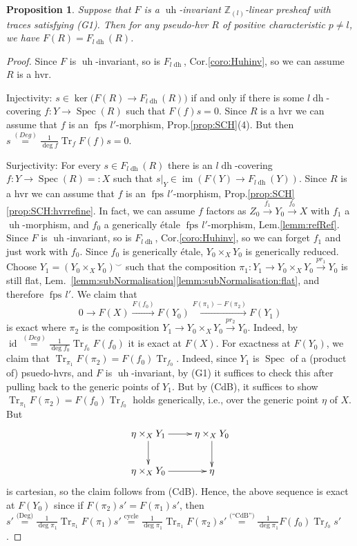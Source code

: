 \documentclass[10pt]{amsart}
\newtheorem{prop}[theo]{Proposition}
\theoremstyle{definition}
\newcommand{\zll}{\mathbb{Z}_{(l)}}
\DeclareMathOperator{\Spec}{Spec}
\DeclareMathOperator{\Tr}{Tr}
\DeclareMathOperator{\id}{id}
\newcommand{\Zar}{\mathsf{Zar}}
\newcommand{\fpsl}{{\operatorname{fps\!}l'}}
\newcommand{\ldh}{{l{\operatorname{dh}}}}
\newcommand{\uh}{\operatorname{uh}}
\begin{document}


\begin{prop} \label{prop:FisFldhonHvr}
Suppose that $F$ is a $\uh$-invariant $\zll$-linear presheaf with traces satisfying (G1). Then for any pseudo-hvr $R$ of positive characteristic $p \neq l$, we have $F(R) = F_\ldh(R)$.
\end{prop}

\begin{proof}
Since $F$ is $\uh$-invariant, so is $F_\ldh$, Cor.\ref{coro:Huhinv}, so we can assume $R$ is a hvr.

Injectivity: $s \in \ker \bigl ( F(R) {\to} F_\ldh(R) \bigr )$ if and only if there is some $\ldh$-covering $f: Y \to \Spec(R)$ such that $F(f)s = 0$. Since $R$ is a hvr we can assume that $f$ is an $\fpsl$-morphism, Prop.\ref{prop:SCH}(4). But then $s \stackrel{(Deg)}{=} \tfrac{1}{\deg f} \Tr_f F(f) s = 0$.

Surjectivity: For every $s \in F_\ldh(R)$ there is an $\ldh$-covering $f: Y \to \Spec(R) =: X$ such that $s|_{Y} \in \operatorname{im} (F(Y) {\to} F_\ldh(Y))$. Since $R$ is a hvr we can assume that $f$ is an $\fpsl$-morphism, Prop.\ref{prop:SCH}\eqref{prop:SCH:hvrrefine}. In fact, we can assume $f$ factors as $Z_0 \stackrel{f_1}{\to} Y_0 \stackrel{f_0}{\to} X$ with $f_1$ a $\uh$-morphism, and $f_0$ a generically étale $\fpsl$-morphism, Lem.\ref{lemm:refRef}. Since $F$ is $\uh$-invariant, so is $F_\ldh$, Cor.\ref{coro:Huhinv}, so we can forget $f_1$ and just work with $f_0$. Since $f_0$ is generically étale, $Y_0 \times_X Y_0$ is generically reduced. Choose $Y_1 = (Y_0 \times_X Y_0)^\smallsmile$ such that the composition $\pi_1: Y_1 \to Y_0 \times_X Y_0 \stackrel{pr_1}{\to} Y_0$ is still flat, Lem.~\ref{lemm:subNormalisation}\eqref{lemm:subNormalisation:flat}, and therefore $\fpsl$. We claim that
\[ 0 \to F(X) \stackrel{F(f_0)}{\longrightarrow} F(Y_0) \stackrel{F(\pi_1) - F(\pi_2)}{\longrightarrow} F(Y_1) \]
is exact where $\pi_2$ is the composition $Y_1 \to Y_0 \times_X Y_0 \stackrel{pr_2}{\to} Y_0$. Indeed, by $\id \stackrel{(Deg)}{=} \tfrac{1}{\deg f_0} \Tr_{f_0}F(f_0)$ it is exact at $F(X)$. For exactness at $F(Y_0)$, we claim that $\Tr_{\pi_1} F(\pi_2) = F(f_0) \Tr_{f_0}$. Indeed, since $Y_1$ is $\Spec$ of a (product of) psuedo-hvrs, and $F$ is $\uh$-invariant, by (G1) it suffices to check this after pulling back to the generic points of $Y_1$. But by (CdB), it suffices to show $\Tr_{\pi_1} F(\pi_2) = F(f_0) \Tr_{f_0}$ holds generically, i.e., over the generic point $\eta$ of $X$. But 
\[ \xymatrix{
\eta \times_X Y_1 \ar[r] \ar[d] & \eta \times_X Y_0 \ar[d] \\
\eta \times_X Y_0 \ar[r] & \eta
} \]
is cartesian, so the claim follows from (CdB). Hence, the above sequence is exact at $F(Y_0)$ since if $F(\pi_2)s' = F(\pi_1)s'$, then $s' 
\stackrel{\textrm{(Deg)}}{=} \tfrac{1}{\deg \pi_1} \Tr_{\pi_1} F(\pi_1)s'
\stackrel{\textrm{cycle}}{=} \tfrac{1}{\deg \pi_1} \Tr_{\pi_1} F(\pi_2)s'
\stackrel{\textrm{(``CdB'')}}{=} \tfrac{1}{\deg \pi_1} F(f_0) \Tr_{f_0}s'$.


\end{proof}
\end{document}
